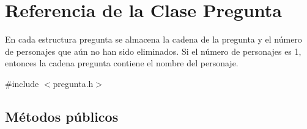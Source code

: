 \hypertarget{classPregunta}{}\section{Referencia de la Clase Pregunta}
\label{classPregunta}


En cada estructura pregunta se almacena la cadena de la pregunta y el número de personajes que aún no han sido eliminados. Si el número de personajes es 1, entonces la cadena pregunta contiene el nombre del personaje.  




{\ttfamily \#include $<$pregunta.\+h$>$}

\subsection*{Métodos públicos}
